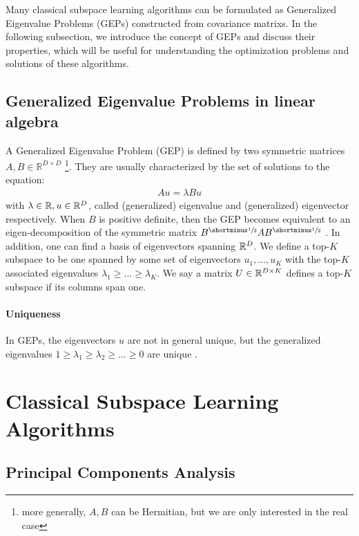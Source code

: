Many classical subspace learning algorithms can be formulated as Generalized Eigenvalue Problems (GEPs) constructed from \glspl{covariance matrix}. In the following subsection, we introduce the concept of GEPs and discuss their properties, which will be useful for understanding the optimization problems and solutions of these algorithms.

\subsection{Generalized Eigenvalue Problems in linear algebra}
A Generalized Eigenvalue Problem (GEP) is defined by two symmetric matrices $A,B\in \mathbb{R}^{D\times D}$ \citep{stewart_matrix_1990}\footnote{more generally, $A,B$ can be Hermitian, but we are only interested in the real case}.
They are usually characterized by the set of solutions to the equation:
\begin{align}
    \label{eq:igep}
    Au=\lambda Bu
\end{align}
with $\lambda \in \mathbb{R}, u \in \mathbb{R}^D$, called (generalized) eigenvalue and (generalized) eigenvector respectively.
When $B$ is positive definite, then the GEP becomes equivalent to an eigen-decomposition of the symmetric matrix $B^\mhalf A B^\mhalf$ \citep{ghojogh2019eigenvalue}.
In addition, one can find a basis of eigenvectors spanning $\mathbb{R}^D$.
We define a top-$K$ subspace to be one spanned by some set of eigenvectors {$u_1,\dots,u_K$} with the top-$K$ associated eigenvalues $\lambda_1 \geq \dots \geq \lambda_K$.
We say a matrix $U \in \mathbb{R}^{D \times K}$ defines a top-$K$ subspace if its columns span one.

\paragraph{Uniqueness}
In GEPs, the eigenvectors $u$ are not in general unique, but the generalized eigenvalues $1 \geq \lambda_1 \geq \lambda_2 \geq \dots \geq 0$ are unique \citep{mills1988calculation}.

\section{Classical Subspace Learning Algorithms}

\subsection{Principal Components Analysis}

